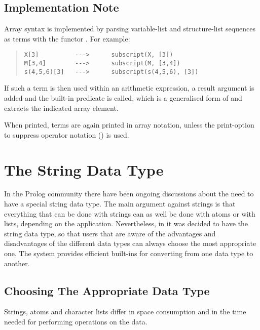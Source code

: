 \subsection{Implementation Note}

Array syntax is implemented by parsing variable-list and
structure-list sequences as terms with the functor .
For example:
\begin{quote}
\begin{verbatim}
X[3]          --->      subscript(X, [3])
M[3,4]        --->      subscript(M, [3,4])
s(4,5,6)[3]   --->      subscript(s(4,5,6), [3])
\end{verbatim}
\end{quote}
If such a term is then used within an arithmetic expression,
a result argument is added and the built-in predicate
is called, which is a generalised form of
and extracts the indicated array element.

When printed,  terms are again printed in array notation,
unless the print-option to suppress operator notation () is used.


\section{The String Data Type}
\label{chapstring}

In the Prolog community there have been ongoing discussions about the need
to have a special string data type.
The main argument against strings is that everything that can be done
with strings can as well be done with atoms or with lists, depending
on the application.
Nevertheless, in {\eclipse} it was decided to have the string data type, so that
users that are aware of the advantages and disadvantages of the
different data types can always choose the most appropriate one.
The system provides efficient built-ins for converting from one data
type to another.

\subsection{Choosing The Appropriate Data Type}
Strings, atoms and character lists differ in space consumption and in
the time needed for performing operations on the data.

